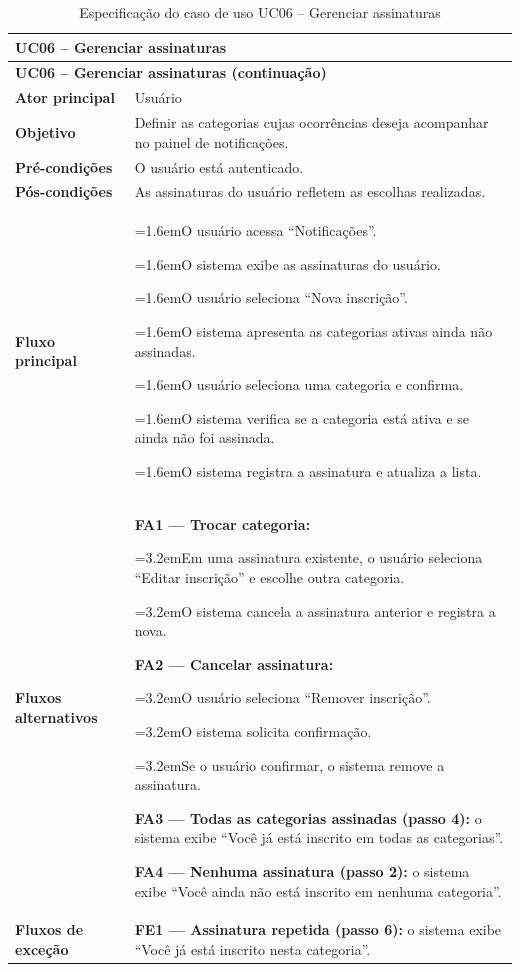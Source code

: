 \documentclass[12pt,a4paper]{article}
\newcommand{\ucitem}[2]{\par\noindent\hangindent=1.6em\hangafter=1\makebox[1.6em][l]{#1}#2}
\newcommand{\ucsubitem}[2]{\par\noindent\hangindent=3.2em\hangafter=1\hspace*{1.6em}\makebox[1.6em][l]{#1}#2}
\begin{document}
\begin{longtable}{|p{}|p{}|}
\caption{Especificação do caso de uso UC06 -- Gerenciar assinaturas}
\label{tab:uc06} \\
\hline
\multicolumn{2}{|l|}{\textbf{UC06 -- Gerenciar assinaturas}} \\
\hline
\endfirsthead

\hline
\multicolumn{2}{|l|}{\textbf{UC06 -- Gerenciar assinaturas (continuação)}} \\
\hline
\endhead

\hline
\endfoot
\textbf{Ator principal} & Usuário \\ \hline
\textbf{Objetivo} & Definir as categorias cujas ocorrências deseja acompanhar no painel de notificações. \\ \hline
\textbf{Pré-condições} & O usuário está autenticado. \\ \hline
\textbf{Pós-condições} & As assinaturas do usuário refletem as escolhas realizadas. \\ \hline
\textbf{Fluxo principal} &
\ucitem{1.}{O usuário acessa ``Notificações''.}
\ucitem{2.}{O sistema exibe as assinaturas do usuário.}
\ucitem{3.}{O usuário seleciona ``Nova inscrição''.}
\ucitem{4.}{O sistema apresenta as categorias ativas ainda não assinadas.}
\ucitem{5.}{O usuário seleciona uma categoria e confirma.}
\ucitem{6.}{O sistema verifica se a categoria está ativa e se ainda não foi assinada.}
\ucitem{7.}{O sistema registra a assinatura e atualiza a lista.} \\ \hline
\textbf{Fluxos alternativos} &
\noindent \textbf{FA1 — Trocar categoria:}
\ucsubitem{1.}{Em uma assinatura existente, o usuário seleciona ``Editar inscrição'' e escolhe outra categoria.}
\ucsubitem{2.}{O sistema cancela a assinatura anterior e registra a nova.}
\par\smallskip\noindent \textbf{FA2 — Cancelar assinatura:}
\ucsubitem{1.}{O usuário seleciona ``Remover inscrição''.}
\ucsubitem{2.}{O sistema solicita confirmação.}
\ucsubitem{3.}{Se o usuário confirmar, o sistema remove a assinatura.}
\par\smallskip\noindent \textbf{FA3 — Todas as categorias assinadas (passo 4):} o sistema exibe ``Você já está inscrito em todas as categorias''.
\par\smallskip\noindent \textbf{FA4 — Nenhuma assinatura (passo 2):} o sistema exibe ``Você ainda não está inscrito em nenhuma categoria''. \\ \hline
\textbf{Fluxos de exceção} &
\noindent \textbf{FE1 — Assinatura repetida (passo 6):} o sistema exibe ``Você já está inscrito nesta categoria''.

\end{longtable}
\end{document}
